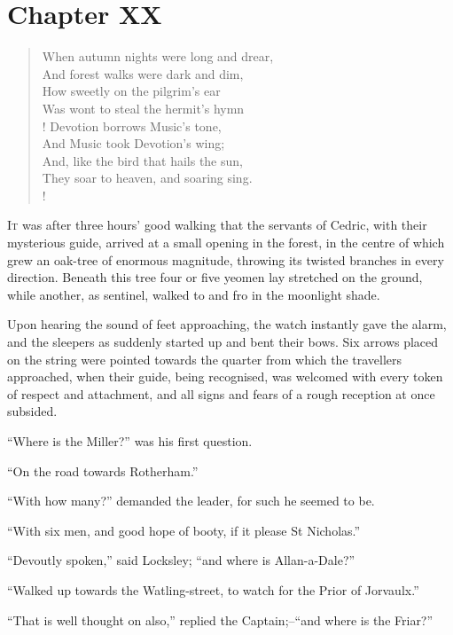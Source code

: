 \chapter{Chapter XX}

\begin{verse}
When autumn nights were long and drear,\\
And forest walks were dark and dim,\\
How sweetly on the pilgrim's ear\\
Was wont to steal the hermit's hymn\\!
Devotion borrows Music's tone,\\
And Music took Devotion's wing;\\
And, like the bird that hails the sun,\\
They soar to heaven, and soaring sing.\\!
\end{verse}

\lettrine{I}{t} was after three hours' good walking that the servants
of Cedric, with
their mysterious guide, arrived at a small opening in the forest, in the
centre of which grew an oak-tree of enormous magnitude, throwing its
twisted branches in every direction. Beneath this tree four or five
yeomen lay stretched on the ground, while another, as sentinel, walked
to and fro in the moonlight shade.

Upon hearing the sound of feet approaching, the watch instantly gave the
alarm, and the sleepers as suddenly started up and bent their bows. Six
arrows placed on the string were pointed towards the quarter from which
the travellers approached, when their guide, being recognised, was
welcomed with every token of respect and attachment, and all signs and
fears of a rough reception at once subsided.

``Where is the Miller?'' was his first question.

``On the road towards Rotherham.''

``With how many?'' demanded the leader, for such he seemed to be.

``With six men, and good hope of booty, if it please St Nicholas.''

``Devoutly spoken,'' said Locksley; ``and where is Allan-a-Dale?''

``Walked up towards the Watling-street, to watch for the Prior of
Jorvaulx.''

``That is well thought on also,'' replied the Captain;--``and where is
the Friar?''

